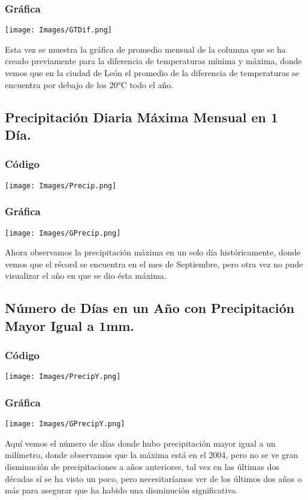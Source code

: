 \documentclass{article}
\begin{document}
\subsubsection{Gráfica}
\begin{center}
    \texttt{[image: Images/GTDif.png]}
\end{center}
Esta vez se muestra la gráfica de promedio mensual de la columna que se ha creado previamente para la diferencia de temperaturas mínima y máxima, donde vemos que en la ciudad de León el promedio de la diferencia de temperaturas se encuentra por debajo de los 20°C todo el año.

\subsection{Precipitación Diaria Máxima Mensual en 1 Día.}
\subsubsection{Código}
\begin{center}
    \texttt{[image: Images/Precip.png]}
\end{center}
\subsubsection{Gráfica}
\begin{center}
    \texttt{[image: Images/GPrecip.png]}
\end{center}
Ahora observamos la precipitación máxima en un solo día históricamente, donde vemos que el récord se encuentra en el mes de Septiembre, pero otra vez no pude visualizar el año en que se dio ésta máxima.

\subsection{Número de Días en un Año con Precipitación Mayor Igual a 1mm.}

\subsubsection{Código}
\begin{center}
    \texttt{[image: Images/PrecipY.png]}
\end{center}

\subsubsection{Gráfica}
\begin{center}
    \texttt{[image: Images/GPrecipY.png]}
\end{center}
Aquí vemos el número de días donde hubo precipitación mayor igual a un milímetro, donde observamos que la máxima está en el 2004, pero no se ve gran disminución de precipitaciones a años anteriores, tal vez en las últimas dos décadas sí se ha visto un poco, pero necesitaríamos ver de los últimos dos años o más para asegurar que ha habido una disminución significativa.  
\end{document}
